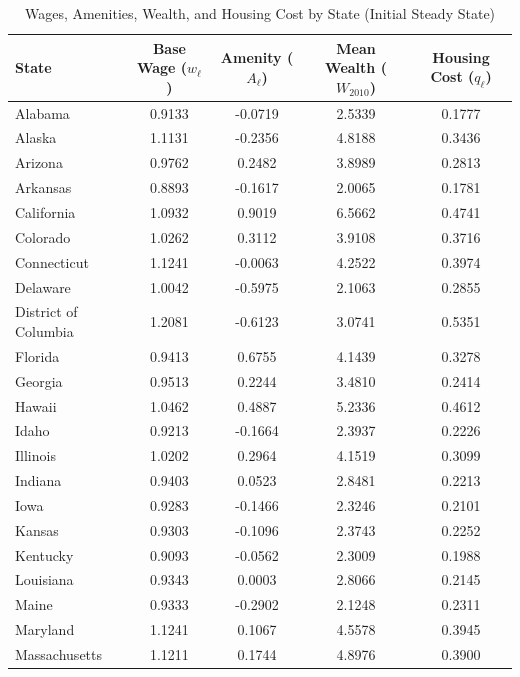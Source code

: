 \begin{table}[H]
    \centering
    \footnotesize
    \renewcommand{\arraystretch}{0.85}
    \caption{Wages, Amenities, Wealth, and Housing Cost by State (Initial Steady State)}
    \label{tab:state_wages_amenities_wealth}
    \begin{tabular}{lcccc}
        \toprule
        \textbf{State} & \textbf{Base Wage} ($w_\ell$) & \textbf{Amenity} ($A_\ell$) & \textbf{Mean Wealth} ($W_{2010}$) & \textbf{Housing Cost} ($q_\ell$) \\
        \midrule
        Alabama & 0.9133 & -0.0719 & 2.5339 & 0.1777 \\
        Alaska & 1.1131 & -0.2356 & 4.8188 & 0.3436 \\
        Arizona & 0.9762 & 0.2482 & 3.8989 & 0.2813 \\
        Arkansas & 0.8893 & -0.1617 & 2.0065 & 0.1781 \\
        California & 1.0932 & 0.9019 & 6.5662 & 0.4741 \\
        Colorado & 1.0262 & 0.3112 & 3.9108 & 0.3716 \\
        Connecticut & 1.1241 & -0.0063 & 4.2522 & 0.3974 \\
        Delaware & 1.0042 & -0.5975 & 2.1063 & 0.2855 \\
        District of Columbia & 1.2081 & -0.6123 & 3.0741 & 0.5351 \\
        Florida & 0.9413 & 0.6755 & 4.1439 & 0.3278 \\
        Georgia & 0.9513 & 0.2244 & 3.4810 & 0.2414 \\
        Hawaii & 1.0462 & 0.4887 & 5.2336 & 0.4612 \\
        Idaho & 0.9213 & -0.1664 & 2.3937 & 0.2226 \\
        Illinois & 1.0202 & 0.2964 & 4.1519 & 0.3099 \\
        Indiana & 0.9403 & 0.0523 & 2.8481 & 0.2213 \\
        Iowa & 0.9283 & -0.1466 & 2.3246 & 0.2101 \\
        Kansas & 0.9303 & -0.1096 & 2.3743 & 0.2252 \\
        Kentucky & 0.9093 & -0.0562 & 2.3009 & 0.1988 \\
        Louisiana & 0.9343 & 0.0003 & 2.8066 & 0.2145 \\
        Maine & 0.9333 & -0.2902 & 2.1248 & 0.2311 \\
        Maryland & 1.1241 & 0.1067 & 4.5578 & 0.3945 \\
        Massachusetts & 1.1211 & 0.1744 & 4.8976 & 0.3900 \\

\end{tabular}
\end{table}
